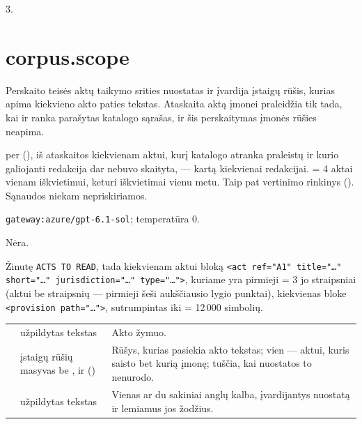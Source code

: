  3.


\section{corpus.scope}\label{sec:aprompts:corpus-scope}

 Perskaito teisės aktų taikymo srities nuostatas ir įvardija įstaigų
rūšis, kurias apima kiekvieno akto paties tekstas. Ataskaita aktą įmonei praleidžia tik tada,
kai ir ranka parašytas katalogo sąrašas, ir šis perskaitymas įmonės rūšies neapima.

  per 
(), iš ataskaitos  kiekvienam aktui, kurį
katalogo atranka praleistų ir kurio galiojanti redakcija dar nebuvo skaityta, --- kartą
kiekvienai redakcijai.  = 4 aktai vienam iškvietimui, keturi iškvietimai
vienu metu. Taip pat vertinimo rinkinys  (). Sąnaudos
niekam nepriskiriamos.

 \texttt{gateway:azure/gpt-6.1-sol}; temperatūra 0.

 Nėra.

 Žinutę \texttt{ACTS TO READ}, tada kiekvienam aktui bloką
\texttt{<act ref="A1" title="…" short="…" jurisdiction="…" type="…">}, kuriame yra pirmieji
 = 3 jo straipsniai (aktui be straipsnių --- pirmieji šeši aukščiausio
lygio punktai), kiekvienas bloke \texttt{<provision path="…">}, sutrumpintas iki
 = 12\,000 simbolių.

\par\nopagebreak
\begin{xltabular}{\textwidth}{@{}L{38mm}L{40mm}Y@{}}
\toprule
{} &  &  \\
\midrule
\endhead
\bottomrule
\endlastfoot
{} & užpildytas tekstas & Akto žymuo. \\
 & įstaigų rūšių masyvas be ,  ir  () & Rūšys, kurias pasiekia akto tekstas; vien  --- aktui, kuris saisto bet kurią įmonę; tuščia, kai nuostatos to nenurodo. \\
 & užpildytas tekstas & Vienas ar du sakiniai anglų kalba, įvardijantys nuostatą ir lemiamus jos žodžius. \\
\end{xltabular}

